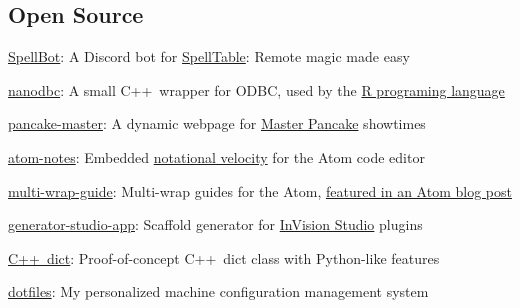 \documentclass[12pt, tweaklist, line]{res}
\let\tempone\itemize
\let\temptwo\enditemize
\renewenvironment{itemize}{\tempone\vspace{-.15in}\setlength{\topsep}{0pt}\setlength{\itemsep}{3pt}\vspace{-.15in}}{\temptwo}
\def\Cplusplus{C++}
\begin{document}
\begin{resume}
\vspace{-.08in}
\section{Open Source}
\begin{itemize}
\vspace{.55in} %
\item \href{https://spellbot.io}{SpellBot}: A Discord bot for \href{https://spelltable.com}{SpellTable}: Remote magic made easy
\item \href{http://nanodbc.io}{nanodbc}: A small \Cplusplus~wrapper for ODBC, used by the \href{https://github.com/r-dbi/odbc}{R programing language}
\item \href{http://pancake.lexicalunit.com}{pancake-master}: A dynamic webpage for \href{https://drafthouse.com/series/master-pancake}{Master Pancake} showtimes
\item \href{https://github.com/lexicalunit/atom-notes}{atom-notes}: Embedded \href{http://notational.net/}{notational velocity} for the Atom code editor
\item \href{https://atom.io/packages/multi-wrap-guide}{multi-wrap-guide}: Multi-wrap guides for the Atom, \href{http://blog.atom.io/2015/08/06/new-package-roundup.html}{featured in an Atom blog post}
\item \href{https://www.npmjs.com/package/generator-studio-app}{generator-studio-app}: Scaffold generator for \href{https://www.invisionapp.com/studio}{InVision Studio} plugins
\item \href{https://github.com/lexicalunit/dict}{\Cplusplus~dict}: Proof-of-concept \Cplusplus~dict class with Python-like features
\item \href{https://github.com/lexicalunit/dotfiles}{dotfiles}: My personalized machine configuration management system
\end{itemize}


\end{resume}
\end{document}
